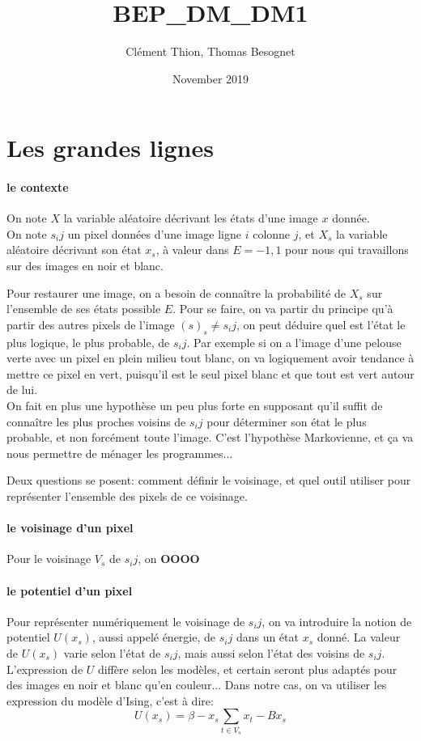 \documentclass[fleqn]{article} %
\title{BEP\_DM\_DM1}
\author{Clément Thion, Thomas Besognet}
\date{November 2019}
\newcounter{question}
\begin{document}
\maketitle

\section{Les grandes lignes}
\paragraph{le contexte}
On note $X$ la variable aléatoire décrivant les états d'une image $x$ donnée.\\
On note $s_ij$ un pixel données d'une image ligne $i$ colonne $j$, et $X_s$ la variable aléatoire décrivant son état $x_s$, à valeur dans $E={-1,1}$ pour nous qui travaillons sur des images en noir et blanc.

Pour restaurer une image, on a besoin de connaître la probabilité de $X_s$ sur l'ensemble de ses états possible $E$. Pour se faire, on va partir du principe qu'à partir des autres pixels de l'image $(s)_s\neq s_ij$, on peut déduire quel est l'état le plus logique, le plus probable, de $s_ij$. Par exemple si on a l'image d'une pelouse verte avec un pixel en plein milieu tout blanc, on va logiquement avoir tendance à mettre ce pixel en vert, puisqu'il est le seul pixel blanc et que tout est vert autour de lui. \\
On fait en plus une hypothèse un peu plus forte en supposant qu'il suffit de connaître les plus proches voisins de $s_ij$ pour déterminer son état le plus probable, et non forcément toute l'image. C'est l'hypothèse Markovienne, et ça va nous permettre de ménager les programmes...

Deux questions se posent: comment définir le voisinage, et quel outil utiliser pour représenter l'ensemble des pixels de ce voisinage.\\
\paragraph{le voisinage d'un pixel} Pour le voisinage $V_s$ de $s_ij$, on \textbf{OOOO}
\paragraph{le potentiel d'un pixel} Pour représenter numériquement le voisinage de $s_ij$, on va introduire la notion de potentiel $U(x_s)$, aussi appelé énergie, de $s_ij$ dans un état $x_s$ donné. La valeur de $U(x_s)$ varie selon l'état de $s_ij$, mais aussi selon l'état des voisins de $s_ij$. L'expression de $U$ diffère selon les modèles, et certain seront plus adaptés pour des images en noir et blanc qu'en couleur... Dans notre cas, on va utiliser les expression du modèle d'Ising\citep{polyrmf}, c'est à dire: \[  U(x_s) = \beta -x_s\sum_{t\in V_s}{x_t} -  Bx_s   \]
\end{document}
